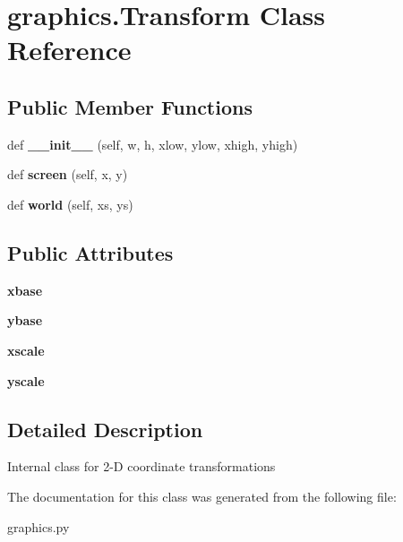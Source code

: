 \hypertarget{classgraphics_1_1_transform}{}\section{graphics.\+Transform Class Reference}
\label{classgraphics_1_1_transform}
\subsection*{Public Member Functions}
\begin{DoxyCompactItemize}
\item 
def {\bfseries \+\_\+\+\_\+init\+\_\+\+\_\+} (self, w, h, xlow, ylow, xhigh, yhigh)\hypertarget{classgraphics_1_1_transform_a826600468986f5938247b1a09dc89097}{}\label{classgraphics_1_1_transform_a826600468986f5938247b1a09dc89097}

\item 
def {\bfseries screen} (self, x, y)\hypertarget{classgraphics_1_1_transform_a52ce3f42703299dcf57d65dbdf856ccc}{}\label{classgraphics_1_1_transform_a52ce3f42703299dcf57d65dbdf856ccc}

\item 
def {\bfseries world} (self, xs, ys)\hypertarget{classgraphics_1_1_transform_adaa57283f32d487d122a5cae919ce1e8}{}\label{classgraphics_1_1_transform_adaa57283f32d487d122a5cae919ce1e8}

\end{DoxyCompactItemize}
\subsection*{Public Attributes}
\begin{DoxyCompactItemize}
\item 
{\bfseries xbase}\hypertarget{classgraphics_1_1_transform_af43d705e45fda80627425215440a0394}{}\label{classgraphics_1_1_transform_af43d705e45fda80627425215440a0394}

\item 
{\bfseries ybase}\hypertarget{classgraphics_1_1_transform_a56bedbb5d2c98e6bf4f1ac28b77688d5}{}\label{classgraphics_1_1_transform_a56bedbb5d2c98e6bf4f1ac28b77688d5}

\item 
{\bfseries xscale}\hypertarget{classgraphics_1_1_transform_aa5d63ba571985d5d70ee661b7e84646f}{}\label{classgraphics_1_1_transform_aa5d63ba571985d5d70ee661b7e84646f}

\item 
{\bfseries yscale}\hypertarget{classgraphics_1_1_transform_aad8322957fc2e0f6b445440f04150c1d}{}\label{classgraphics_1_1_transform_aad8322957fc2e0f6b445440f04150c1d}

\end{DoxyCompactItemize}


\subsection{Detailed Description}
\begin{DoxyVerb}Internal class for 2-D coordinate transformations\end{DoxyVerb}
 

The documentation for this class was generated from the following file\+:\begin{DoxyCompactItemize}
\item 
graphics.\+py\end{DoxyCompactItemize}
